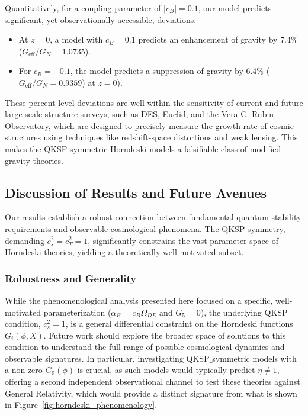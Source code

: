 \documentclass[twocolumn]{aastex631}
\begin{document}
Quantitatively, for a coupling parameter of $|c_B|=0.1$, our model predicts significant, yet observationally accessible, deviations:
\begin{itemize}
    \item At $z=0$, a model with $c_B = 0.1$ predicts an enhancement of gravity by $7.4\%$ ($G_{\text{eff}}/G_N = 1.0735$).
    \item For $c_B = -0.1$, the model predicts a suppression of gravity by $6.4\%$ ($G_{\text{eff}}/G_N = 0.9359$) at $z=0$).
\end{itemize}
These percent-level deviations are well within the sensitivity of current and future large-scale structure surveys, such as DES, Euclid, and the Vera C. Rubin Observatory, which are designed to precisely measure the growth rate of cosmic structures using techniques like redshift-space distortions and weak lensing. This makes the QKSP\ensuremath{\_}symmetric Horndeski models a falsifiable class of modified gravity theories.

\subsection{Discussion of Results and Future Avenues}
Our results establish a robust connection between fundamental quantum stability requirements and observable cosmological phenomena. The QKSP symmetry, demanding $c_s^2 = c_T^2 = 1$, significantly constrains the vast parameter space of Horndeski theories, yielding a theoretically well-motivated subset.

\subsubsection{Robustness and Generality}
While the phenomenological analysis presented here focused on a specific, well-motivated parameterization ($\alpha_B = c_B \Omega_{DE}$ and $G_5=0$), the underlying QKSP condition, $c_s^2=1$, is a general differential constraint on the Horndeski functions $G_i(\phi, X)$. Future work should explore the broader space of solutions to this condition to understand the full range of possible cosmological dynamics and observable signatures. In particular, investigating QKSP\ensuremath{\_}symmetric models with a non-zero $G_5(\phi)$ is crucial, as such models would typically predict $\eta \neq 1$, offering a second independent observational channel to test these theories against General Relativity, which would provide a distinct signature from what is shown in \mbox{Figure \ref{fig:horndeski_phenomenology}}.
\end{document}
